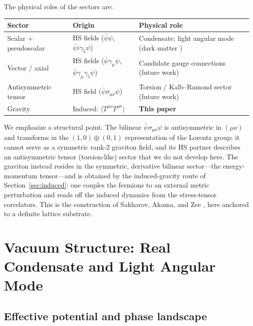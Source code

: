 \documentclass[11pt,a4paper]{article}
\begin{document}
The physical roles of the sectors are:
\begin{center}
\begin{tabular}{lll}
\toprule
Sector & Origin & Physical role \\
\midrule
Scalar + pseudoscalar & HS fields ($\bar{\psi}\psi$,
  $\bar{\psi}i\gamma_5\psi$) & Condensate; light angular mode
  (dark matter \cite{Cheng:2025sparc}) \\
Vector / axial & HS fields ($\bar{\psi}\gamma_\mu\psi$,
  $\bar{\psi}\gamma_\mu\gamma_5\psi$) & Candidate gauge
  connections (future work) \\
Antisymmetric tensor & HS field ($\bar{\psi}\sigma_{\mu\nu}\psi$)
  & Torsion / Kalb--Ramond sector (future work) \\
Gravity & Induced: $\langle T^{\mu\nu}T^{\rho\sigma}\rangle$
  & \textbf{This paper} \\
\bottomrule
\end{tabular}
\end{center}

We emphasize a structural point.
The bilinear $\bar{\psi}\sigma_{\mu\nu}\psi$ is antisymmetric in
$(\mu\nu)$ and transforms in the $(1,0)\oplus(0,1)$ representation
of the Lorentz group; it cannot serve as a symmetric rank-2
graviton field, and its HS partner describes an antisymmetric
tensor (torsion-like) sector that we do not develop here.
The graviton instead resides in the symmetric, derivative bilinear
sector---the energy-momentum tensor---and is obtained by the
induced-gravity route of Section~\ref{sec:induced}: one couples
the fermions to an external metric perturbation and reads off the
induced dynamics from the stress-tensor correlators.
This is the construction of Sakharov, Akama, and Zee
\cite{Sakharov:1967pk,Akama:1978pg,Zee:1981}, here anchored to a
definite lattice substrate.


\section{Vacuum Structure: Real Condensate and Light Angular Mode}
\label{sec:vacuum}

\subsection{Effective potential and phase landscape}
\end{document}
